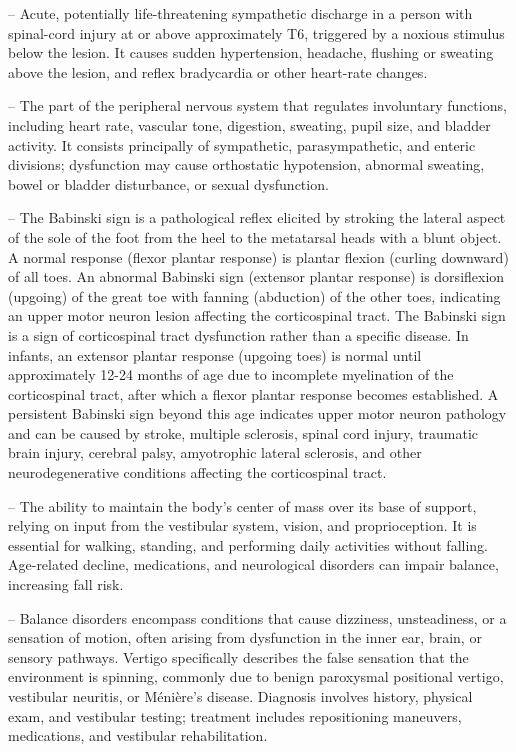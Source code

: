 -- Acute, potentially life-threatening sympathetic discharge in a person with spinal-cord injury at or above approximately T6, triggered by a noxious stimulus below the lesion. It causes sudden hypertension, headache, flushing or sweating above the lesion, and reflex bradycardia or other heart-rate changes.

-- The part of the peripheral nervous system that regulates involuntary functions, including heart rate, vascular tone, digestion, sweating, pupil size, and bladder activity. It consists principally of sympathetic, parasympathetic, and enteric divisions; dysfunction may cause orthostatic hypotension, abnormal sweating, bowel or bladder disturbance, or sexual dysfunction.

-- The Babinski sign is a pathological reflex elicited by stroking the lateral aspect of the sole of the foot from the heel to the metatarsal heads with a blunt object. A normal response (flexor plantar response) is plantar flexion (curling downward) of all toes. An abnormal Babinski sign (extensor plantar response) is dorsiflexion (upgoing) of the great toe with fanning (abduction) of the other toes, indicating an upper motor neuron lesion affecting the corticospinal tract. The Babinski sign is a sign of corticospinal tract dysfunction rather than a specific disease. In infants, an extensor plantar response (upgoing toes) is normal until approximately 12-24 months of age due to incomplete myelination of the corticospinal tract, after which a flexor plantar response becomes established. A persistent Babinski sign beyond this age indicates upper motor neuron pathology and can be caused by stroke, multiple sclerosis, spinal cord injury, traumatic brain injury, cerebral palsy, amyotrophic lateral sclerosis, and other neurodegenerative conditions affecting the corticospinal tract.

-- The ability to maintain the body's center of mass over its base of support, relying on input from the vestibular system, vision, and proprioception. It is essential for walking, standing, and performing daily activities without falling. Age-related decline, medications, and neurological disorders can impair balance, increasing fall risk.

-- Balance disorders encompass conditions that cause dizziness, unsteadiness, or a sensation of motion, often arising from dysfunction in the inner ear, brain, or sensory pathways. Vertigo specifically describes the false sensation that the environment is spinning, commonly due to benign paroxysmal positional vertigo, vestibular neuritis, or M\'eni\`ere's disease. Diagnosis involves history, physical exam, and vestibular testing; treatment includes repositioning maneuvers, medications, and vestibular rehabilitation.

